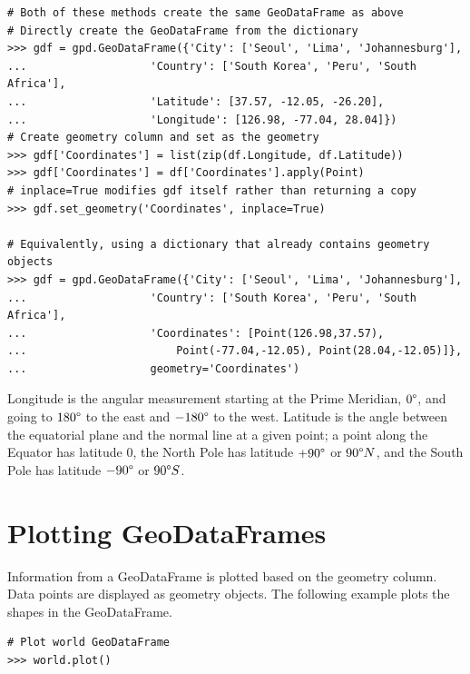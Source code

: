 \begin{lstlisting}
# Both of these methods create the same GeoDataFrame as above
# Directly create the GeoDataFrame from the dictionary
>>> gdf = gpd.GeoDataFrame({'City': ['Seoul', 'Lima', 'Johannesburg'],
...                   'Country': ['South Korea', 'Peru', 'South Africa'],
...                   'Latitude': [37.57, -12.05, -26.20],
...                   'Longitude': [126.98, -77.04, 28.04]})
# Create geometry column and set as the geometry
>>> gdf['Coordinates'] = list(zip(df.Longitude, df.Latitude))
>>> gdf['Coordinates'] = df['Coordinates'].apply(Point)
# inplace=True modifies gdf itself rather than returning a copy
>>> gdf.set_geometry('Coordinates', inplace=True)

# Equivalently, using a dictionary that already contains geometry objects
>>> gdf = gpd.GeoDataFrame({'City': ['Seoul', 'Lima', 'Johannesburg'],
...                   'Country': ['South Korea', 'Peru', 'South Africa'],
...                   'Coordinates': [Point(126.98,37.57),
...                       Point(-77.04,-12.05), Point(28.04,-12.05)]},
...                   geometry='Coordinates')
\end{lstlisting}

\begin{info}
Longitude is the angular measurement starting at the Prime Meridian, $0\degree$, and going to $180\degree$ to the east and $-180\degree$ to the west.
Latitude is the angle between the equatorial plane and the normal line at a given point; a point along the Equator has latitude $0$, the North Pole has latitude $+90\degree$ or $90\degree N$, and the South Pole has latitude $-90\degree$ or $90\degree S$.
\end{info}

\section*{Plotting GeoDataFrames} %

Information from a GeoDataFrame is plotted based on the geometry column.
Data points are displayed as geometry objects.
The following example plots the shapes in the  GeoDataFrame.

\begin{lstlisting}
# Plot world GeoDataFrame
>>> world.plot()
\end{lstlisting}

